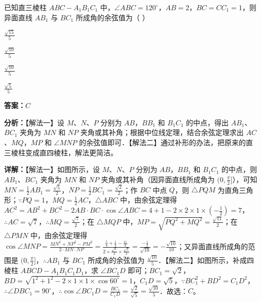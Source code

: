 \begin{question}[points=5]
已知直三棱柱 $ABC-A_1B_1C_1$ 中，$\angle ABC=120^\circ$，$AB=2$，$BC=CC_1=1$，则异面直线 $AB_1$ 与 $BC_1$ 所成角的余弦值为（   ）
\begin{choices}
  \item $\frac{\sqrt{15}}{5}$
  \item $\frac{\sqrt{10}}{5}$
  \item $\frac{\sqrt{10}}{5}$
  \item $\frac{\sqrt{5}}{5}$
\end{choices}
\begin{solution}
\textbf{答案：}$C$

\textbf{分析：}【解法一】设 $M$、$N$、$P$ 分别为 $AB$，$BB_1$ 和 $B_1C_1$ 的中点，得出 $AB_1$、$BC_1$ 夹角为 $MN$ 和 $NP$ 夹角或其补角；根据中位线定理，结合余弦定理求出 $AC$、$MQ$，$MP$ 和 $\angle MNP$ 的余弦值即可．【解法二】通过补形的办法，把原来的直三棱柱变成直四棱柱，解法更简洁。

\textbf{详解：}【解法一】如图所示，设 $M$、$N$、$P$ 分别为 $AB$，$BB_1$ 和 $B_1C_1$ 的中点，则 $AB_1$、$BC_1$ 夹角为 $MN$ 和 $NP$ 夹角或其补角（因异面直线所成角为 $(0,\frac{\pi}{2}]$），可知 $MN=\frac{1}{2}AB_1=\frac{\sqrt{5}}{2}$，$NP=\frac{1}{2}BC_1=\frac{\sqrt{2}}{2}$；作 $BC$ 中点 $Q$，则 $\triangle PQM$ 为直角三角形；$\because PQ=1$，$MQ=\frac{1}{2}AC$，$\triangle ABC$ 中，由余弦定理得 $AC^2=AB^2+BC^2-2AB\cdot BC\cdot\cos\angle ABC=4+1-2\times2\times1\times(-\frac{1}{2})=7$，$\therefore AC=\sqrt{7}$，$\therefore MQ=\frac{\sqrt{7}}{2}$；在 $\triangle MQP$ 中，$MP=\sqrt{PQ^2+MQ^2}=\frac{\sqrt{11}}{2}$；在 $\triangle PMN$ 中，由余弦定理得 $\cos\angle MNP=\frac{MN^2+NP^2-PM^2}{2\cdot MN\cdot NP}=\frac{\frac{5}{4}+\frac{1}{2}-\frac{11}{4}}{2\times\frac{\sqrt{5}}{2}\times\frac{\sqrt{2}}{2}}=\frac{-\frac{1}{2}}{\sqrt{10}}=-\frac{\sqrt{10}}{10}$；又异面直线所成角的范围是 $(0,\frac{\pi}{2}]$，$\therefore AB_1$ 与 $BC_1$ 所成角的余弦值为 $\frac{\sqrt{10}}{5}$．【解法二】如图所示，补成四棱柱 $ABCD-A_1B_1C_1D_1$，求 $\angle BC_1D$ 即可；$BC_1=\sqrt{2}$，$BD=\sqrt{1^2+1^2-2\times1\times1\times\cos60^\circ}=1$，$C_1D=\sqrt{5}$，$\because BC_1^2+BD^2=C_1D^2$，$\therefore\angle DBC_1=90^\circ$，$\therefore\cos\angle BC_1D=\frac{BC_1}{C_1D}=\frac{\sqrt{2}}{\sqrt{5}}=\frac{\sqrt{10}}{5}$．故选：$C$。
\end{solution}
\end{question}

